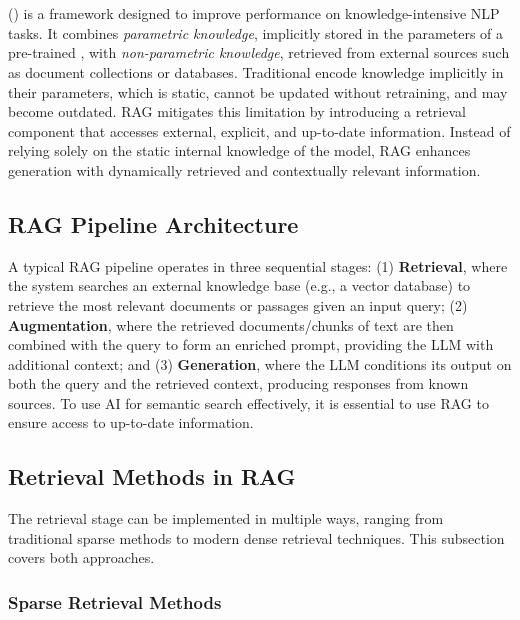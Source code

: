 \section{}
\label{sec:rag}

() is a framework designed to improve performance on knowledge-intensive \gls{NLP} tasks. It combines \textit{parametric knowledge}, implicitly stored in the parameters of a pre-trained , with \textit{non-parametric knowledge}, retrieved from external sources such as document collections or databases. Traditional  encode knowledge implicitly in their parameters, which is static, cannot be updated without retraining, and may become outdated. \gls{RAG} mitigates this limitation by introducing a retrieval component that accesses external, explicit, and up-to-date information. Instead of relying solely on the static internal knowledge of the model, RAG enhances generation with dynamically retrieved and contextually relevant information.

\subsection{RAG Pipeline Architecture}
A typical RAG pipeline operates in three sequential stages: (1) \textbf{Retrieval}, where the system searches an external knowledge base (e.g., a vector database) to retrieve the most relevant documents or passages given an input query; (2) \textbf{Augmentation}, where the retrieved documents/chunks of text are then combined with the query to form an enriched prompt, providing the \gls{LLM} with additional context; and (3) \textbf{Generation}, where the \gls{LLM} conditions its output on both the query and the retrieved context, producing responses from known sources. To use AI for semantic search effectively, it is essential to use \gls{RAG} to ensure access to up-to-date information.

\subsection{Retrieval Methods in RAG}

The retrieval stage can be implemented in multiple ways, ranging from traditional sparse methods to modern dense retrieval techniques. This subsection covers both approaches.

\subsubsection{Sparse Retrieval Methods}

